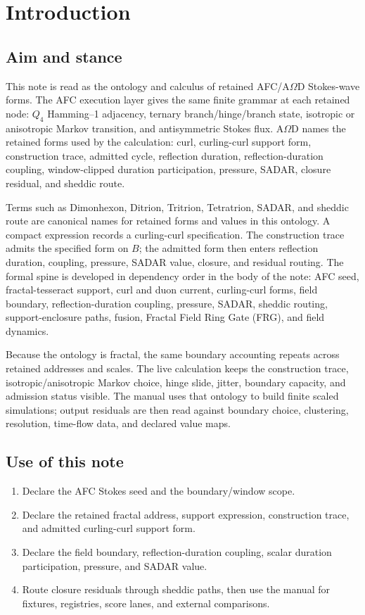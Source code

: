 \section{Introduction}\label{sec:introduction}

\subsection{Aim and stance}\label{subsec:intro-aim-stance}
This note is read as the ontology and calculus of retained AFC/A\(\Omega\)D Stokes-wave forms. The AFC execution layer gives the same finite grammar at each retained node: \(Q_4\) Hamming--1 adjacency, ternary branch/hinge/branch state, isotropic or anisotropic Markov transition, and antisymmetric Stokes flux. A\(\Omega\)D names the retained forms used by the calculation: curl, curling-curl support form, construction trace, admitted cycle, reflection duration, reflection-duration coupling, window-clipped duration participation, pressure, SADAR, closure residual, and sheddic route.

Terms such as Dimonhexon, Ditrion, Tritrion, Tetratrion, SADAR, and sheddic route are canonical names for retained forms and values in this ontology. A compact expression records a curling-curl specification. The construction trace admits the specified form on \(B\); the admitted form then enters reflection duration, coupling, pressure, SADAR value, closure, and residual routing. The formal spine is developed in dependency order in the body of the note: AFC seed, fractal-tesseract support, curl and duon current, curling-curl forms, field boundary, reflection-duration coupling, pressure, SADAR, sheddic routing, support-enclosure paths, fusion, Fractal Field Ring Gate (FRG), and field dynamics.

Because the ontology is fractal, the same boundary accounting repeats across retained addresses and scales. The live calculation keeps the construction trace, isotropic/anisotropic Markov choice, hinge slide, jitter, boundary capacity, and admission status visible. The manual uses that ontology to build finite scaled simulations; output residuals are then read against boundary choice, clustering, resolution, time-flow data, and declared value maps.

\subsection{Use of this note}\label{subsec:intro-use}
\begin{enumerate}[leftmargin=2.2em]
\item Declare the AFC Stokes seed and the boundary/window scope.
\item Declare the retained fractal address, support expression, construction trace, and admitted curling-curl support form.
\item Declare the field boundary, reflection-duration coupling, scalar duration participation, pressure, and SADAR value.
\item Route closure residuals through sheddic paths, then use the manual for fixtures, registries, score lanes, and external comparisons.
\end{enumerate}


